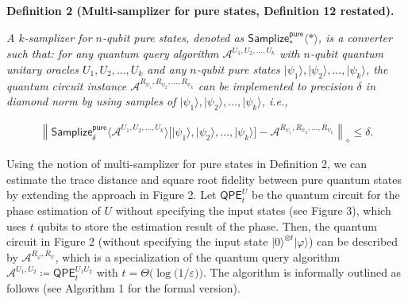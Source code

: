 

\par\medskip\noindent\textbf{
\textbf{Definition 2}\textbf{ }(Multi-samplizer for pure states, Definition 12 restated)\textbf{.}
}\par



\emph{A $k$-samplizer for $n$-qubit pure states, denoted as $\mathsf{Samplize}^{\mathsf{pure}}_{*}\langle*\rangle$, is a converter such that:
for any quantum query algorithm $\mathcal{A}^{U_{1},U_{2},\dots,U_{k}}$ with $n$-qubit quantum unitary oracles $U_{1},U_{2},\dots,U_{k}$ and any $n$-qubit pure states $\lvert\psi_{1}\rangle,\lvert\psi_{2}\rangle,\dots,\lvert\psi_{k}\rangle$, the quantum circuit instance $\mathcal{A}^{R_{\psi_{1}},R_{\psi_{2}},\dots,R_{\psi_{k}}}$ can be implemented to precision $\delta$ in diamond norm by using samples of $\lvert\psi_{1}\rangle,\lvert\psi_{2}\rangle,\dots,\lvert\psi_{k}\rangle$, i.e.,}\par


\[\begin{gathered}
\left\lVert\mathsf{Samplize}^{\mathsf{pure}}_{\delta}\big\langle\mathcal{A}^{U_{1},U_{2},\dots,U_{k}}\big\rangle\big[\lvert\psi_{1}\rangle,\lvert\psi_{2}\rangle,\dots,\lvert\psi_{k}\rangle\big]-\mathcal{A}^{R_{\psi_{1}},R_{\psi_{2}},\dots,R_{\psi_{k}}}\right\rVert_{\diamond}\leq\delta.
\end{gathered}\]






Using the notion of multi-samplizer for pure states in Definition 2, we can estimate the trace distance and square root fidelity between pure quantum states by extending the approach in Figure 2.
Let $\mathsf{QPE}^{U}_{t}$ be the quantum circuit for the phase estimation of $U$ without specifying the input states (see Figure 3), which uses $t$ qubits to store the estimation result of the phase.
Then, the quantum circuit in Figure 2 (without specifying the input state $\lvert 0\rangle^{\otimes t}\lvert\varphi\rangle$) can be described by $\mathcal{A}^{R_{\varphi},R_{\psi}}$, which is a specialization of the quantum query algorithm $\mathcal{A}^{U_{1},U_{2}}\coloneqq\mathsf{QPE}^{U_{1}U_{2}}_{t}$ with $t=\Theta\lparen\log\lparen 1/\varepsilon\rparen\rparen$.
The algorithm is informally outlined as follows (see Algorithm 1 for the formal version).\par





